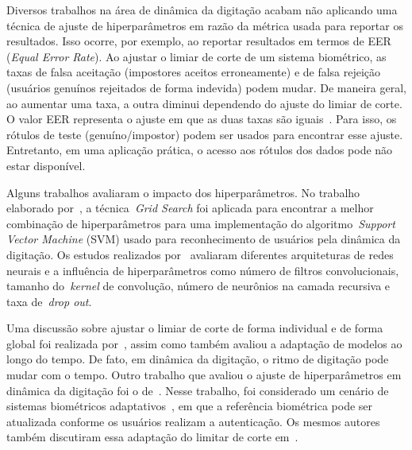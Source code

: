 Diversos trabalhos na área de dinâmica da digitação acabam não aplicando uma técnica de ajuste de hiperparâmetros em razão da métrica usada para reportar os resultados. Isso ocorre, por exemplo, ao reportar resultados em termos de EER (\textit{Equal Error Rate}). Ao ajustar o limiar de corte de um sistema biométrico, as taxas de falsa aceitação (impostores aceitos erroneamente) e de falsa rejeição (usuários genuínos rejeitados de forma indevida) podem mudar. De maneira geral, ao aumentar uma taxa, a outra diminui dependendo do ajuste do limiar de corte. O valor EER representa o ajuste em que as duas taxas são iguais~\cite{Roy2022systematic}. Para isso, os rótulos de teste (genuíno/impostor) podem ser usados para encontrar esse ajuste. Entretanto, em uma aplicação prática, o acesso aos rótulos dos dados pode não estar disponível.

Alguns trabalhos avaliaram o impacto dos hiperparâmetros. No trabalho elaborado por~, a técnica~\textit{Grid Search} foi aplicada para encontrar a melhor combinação de hiperparâmetros para uma implementação do algoritmo~\textit{Support Vector Machine} (SVM) usado para reconhecimento de usuários pela dinâmica da digitação. Os estudos realizados por~ avaliaram diferentes arquiteturas de redes neurais e a influência de hiperparâmetros como número de filtros convolucionais, tamanho do~\textit{kernel} de convolução, número de neurônios na camada recursiva e taxa de~\textit{drop out}.

Uma discussão sobre ajustar o limiar de corte de forma individual e de forma global foi realizada por~, assim como também avaliou a adaptação de modelos ao longo do tempo. De fato, em dinâmica da digitação, o ritmo de digitação pode mudar com o tempo. Outro trabalho que avaliou o ajuste de hiperparâmetros em dinâmica da digitação foi o de~. Nesse trabalho, foi considerado um cenário de sistemas biométricos adaptativos~\cite{Ryu2023Design}, em que a referência biométrica pode ser atualizada conforme os usuários realizam a autenticação. Os mesmos autores também discutiram essa adaptação do limitar de corte em~\cite{Mhenni2019DoubleSerial}.
